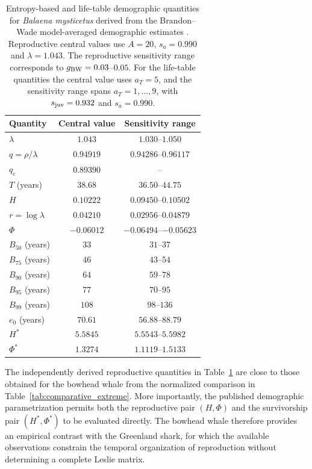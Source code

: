 \documentclass[11pt,a4paper]{amsart}
\begin{document}
\begin{table}[ht]
\centering
\caption{Entropy-based and life-table demographic quantities for
\textit{Balaena mysticetus} derived from the Brandon--Wade
model-averaged demographic estimates \cite{BrandonWade2006}.
Reproductive central values use $A=20$, $s_a=0.990$ and
$\lambda=1.043$. The reproductive sensitivity range corresponds to
$g_{\rm BW}=0.03$--$0.05$. For the life-table quantities the central
value uses $a_T=5$, and the sensitivity range spans
$a_T=1,\ldots,9$, with $s_{\rm juv}=0.932$ and $s_a=0.990$.}
\label{tab:bowhead-benchmark}
\begin{tabular}{lcc}
\hline
Quantity & Central value & Sensitivity range \\
\hline
$\lambda$
    & $1.043$    & $1.030$--$1.050$ \\
$q=\rho/\lambda$
    & $0.94919$  & $0.94286$--$0.96117$ \\
$q_c$
    & $0.89390$  & -- \\
$T$ (years)
    & $38.68$    & $36.50$--$44.75$ \\
$H$
    & $0.10222$  & $0.09450$--$0.10502$ \\
$r=\log\lambda$
    & $0.04210$  & $0.02956$--$0.04879$ \\
$\Phi$
    & $-0.06012$ & $-0.06494$--$-0.05623$ \\
$B_{50}$ (years)
    & $33$       & $31$--$37$ \\
$B_{75}$ (years)
    & $46$       & $43$--$54$ \\
$B_{90}$ (years)
    & $64$       & $59$--$78$ \\
$B_{95}$ (years)
    & $77$       & $70$--$95$ \\
$B_{99}$ (years)
    & $108$      & $98$--$136$ \\
$e_0$ (years)
    & $70.61$    & $56.88$--$88.79$ \\
$H^\ast$
    & $5.5845$   & $5.5543$--$5.5982$ \\
$\Phi^\ast$
    & $1.3274$   & $1.1119$--$1.5133$ \\
\hline
\end{tabular}
\end{table}

The independently derived reproductive quantities in
Table~\ref{tab:bowhead-benchmark} are close to those obtained for
the bowhead whale from the normalized comparison in
Table~\ref{tab:comparative_extreme}. More importantly, the published
demographic parametrization permits both the reproductive pair
$(H,\Phi)$ and the survivorship pair $(H^\ast,\Phi^\ast)$ to be
evaluated directly. The bowhead whale therefore provides an
empirical contrast with the Greenland shark, for which the available
observations constrain the temporal organization of reproduction
without determining a complete Leslie matrix.
\end{document}
